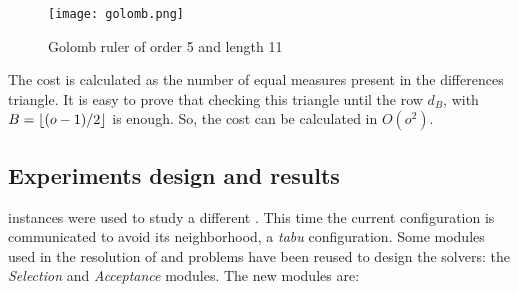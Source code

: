 
\begin{figure}[h]
\centering
\texttt{[image: golomb.png]}
\caption[]{Golomb ruler of order 5 and length 11}
\label{fig:ex_golomb}
\end{figure}

The cost is calculated as the number of equal measures present in the differences triangle. It is easy to prove that checking this triangle until the row $d_B$, with $B=\floor*{(o-1)/2}$ is enough. So, the cost can be calculated in $O\left(o^2\right)$. %

\subsection{Experiments design and results}

\grp{} instances were used to study a different \commstr. This time the current configuration is communicated to avoid its neighborhood, \ie a {\it tabu} configuration. Some modules used in the resolution of \sg{} and \carr{} problems have been reused to design the solvers: the \textit{Selection} and \textit{Acceptance} modules. The new modules are:

